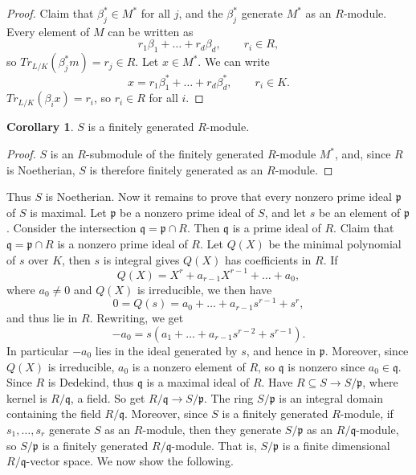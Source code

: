 \documentclass{article}
\newcommand{\rb}[1]{\left( #1 \right)}
\theoremstyle{definition}\newtheorem{definition}{Definition}[subsection]
\theoremstyle{definition}\newtheorem{remark}[definition]{Remark}
\theoremstyle{definition}\newtheorem*{example}{Example}
\theoremstyle{definition}\newtheorem*{note}{Note}
\newtheorem{corollary}[definition]{Corollary}
\begin{document}
\begin{proof}
Claim that $ \beta_j^* \in M^* $ for all $ j $, and the $ \beta_j^* $ generate $ M^* $ as an $ R $-module. Every element of $ M $ can be written as
$$ r_1\beta_1 + \dots + r_d\beta_d, \qquad r_i \in R, $$
so $ Tr_{L / K}\rb{\beta_j^*m} = r_j \in R $. Let $ x \in M^* $. We can write
$$ x = r_1\beta_1^* + \dots + r_d\beta_d^*, \qquad r_i \in K. $$
$ Tr_{L / K}\rb{\beta_ix} = r_i $, so $ r_i \in R $ for all $ i $.
\end{proof}

\begin{corollary}
$ S $ is a finitely generated $ R $-module.
\end{corollary}

\begin{proof}
$ S $ is an $ R $-submodule of the finitely generated $ R $-module $ M^* $, and, since $ R $ is Noetherian, $ S $ is therefore finitely generated as an $ R $-module.
\end{proof}

Thus $ S $ is Noetherian. Now it remains to prove that every nonzero prime ideal $ \mathfrak{p} $ of $ S $ is maximal. Let $ \mathfrak{p} $ be a nonzero prime ideal of $ S $, and let $ s $ be an element of $ \mathfrak{p} $. Consider the intersection $ \mathfrak{q} = \mathfrak{p} \cap R $. Then $ \mathfrak{q} $ is a prime ideal of $ R $. Claim that $ \mathfrak{q} = \mathfrak{p} \cap R $ is a nonzero prime ideal of $ R $. Let $ Q\rb{X} $ be the minimal polynomial of $ s $ over $ K $, then $ s $ is integral gives $ Q\rb{X} $ has coefficients in $ R $. If
$$ Q\rb{X} = X^r + a_{r - 1}X^{r - 1} + \dots + a_0, $$
where $ a_0 \ne 0 $ and $ Q\rb{X} $ is irreducible, we then have
$$ 0 = Q\rb{s} = a_0 + \dots + a_{r - 1}s^{r - 1} + s^r, $$
and thus lie in $ R $. Rewriting, we get
$$ -a_0 = s\rb{a_1 + \dots + a_{r - 1}s^{r - 2} + s^{r - 1}}. $$
In particular $ -a_0 $ lies in the ideal generated by $ s $, and hence in $ \mathfrak{p} $. Moreover, since $ Q\rb{X} $ is irreducible, $ a_0 $ is a nonzero element of $ R $, so $ \mathfrak{q} $ is nonzero since $ a_0 \in \mathfrak{q} $. Since $ R $ is Dedekind, thus $ \mathfrak{q} $ is a maximal ideal of $ R $. Have $ R \subseteq S \to S / \mathfrak{p} $, where kernel is $ R / \mathfrak{q} $, a field. So get $ R / \mathfrak{q} \to S / \mathfrak{p} $. The ring $ S / \mathfrak{p} $ is an integral domain containing the field $ R / \mathfrak{q} $. Moreover, since $ S $ is a finitely generated $ R $-module, if $ s_1, \dots, s_r $ generate $ S $ as an $ R $-module, then they generate $ S / \mathfrak{p} $ as an $ R / \mathfrak{q} $-module, so $ S / \mathfrak{p} $ is a finitely generated $ R / \mathfrak{q} $-module. That is, $ S / \mathfrak{p} $ is a finite dimensional $ R / \mathfrak{q} $-vector space. We now show the following.
\end{document}
